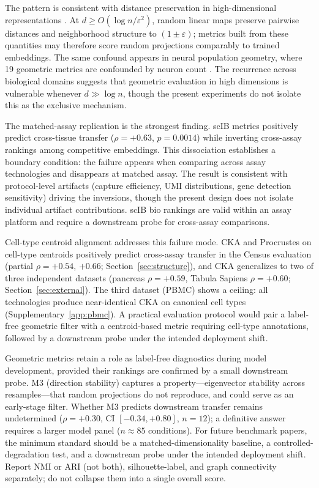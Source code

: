 \documentclass[11pt]{article}
\begin{document}
The pattern is consistent with distance preservation in high-dimensional representations \citep{johnsonlindenstrauss1984}. At $d \geq O(\log n / \varepsilon^2)$, random linear maps preserve pairwise distances and neighborhood structure to $(1 \pm \varepsilon)$; metrics built from these quantities may therefore score random projections comparably to trained embeddings. The same confound appears in neural population geometry, where 19 geometric metrics are confounded by neuron count \citep{tower2026bracket}. The recurrence across biological domains suggests that geometric evaluation in high dimensions is vulnerable whenever $d \gg \log n$, though the present experiments do not isolate this as the exclusive mechanism.

The matched-assay replication is the strongest finding. scIB metrics positively predict cross-tissue transfer ($\rho = +0.63$, $p = 0.0014$) while inverting cross-assay rankings among competitive embeddings. This dissociation establishes a boundary condition: the failure appears when comparing across assay technologies and disappears at matched assay. The result is consistent with protocol-level artifacts (capture efficiency, UMI distributions, gene detection sensitivity) driving the inversions, though the present design does not isolate individual artifact contributions. scIB bio rankings are valid within an assay platform and require a downstream probe for cross-assay comparisons.

Cell-type centroid alignment addresses this failure mode. CKA and Procrustes on cell-type centroids positively predict cross-assay transfer in the Census evaluation (partial $\rho = +0.54$, $+0.66$; Section~\ref{sec:structure}), and CKA generalizes to two of three independent datasets (pancreas $\rho = +0.59$, Tabula Sapiens $\rho = +0.60$; Section~\ref{sec:external}). The third dataset (PBMC) shows a ceiling: all technologies produce near-identical CKA on canonical cell types (Supplementary~\ref{app:pbmc}). A practical evaluation protocol would pair a label-free geometric filter with a centroid-based metric requiring cell-type annotations, followed by a downstream probe under the intended deployment shift.

Geometric metrics retain a role as label-free diagnostics during model development, provided their rankings are confirmed by a small downstream probe. M3 (direction stability) captures a property---eigenvector stability across resamples---that random projections do not reproduce, and could serve as an early-stage filter. Whether M3 predicts downstream transfer remains undetermined ($\rho = +0.30$, CI $[-0.34, +0.80]$, $n = 12$); a definitive answer requires a larger model panel ($n \approx 85$ conditions). For future benchmark papers, the minimum standard should be a matched-dimensionality baseline, a controlled-degradation test, and a downstream probe under the intended deployment shift. Report NMI or ARI (not both), silhouette-label, and graph connectivity separately; do not collapse them into a single overall score.
\end{document}
